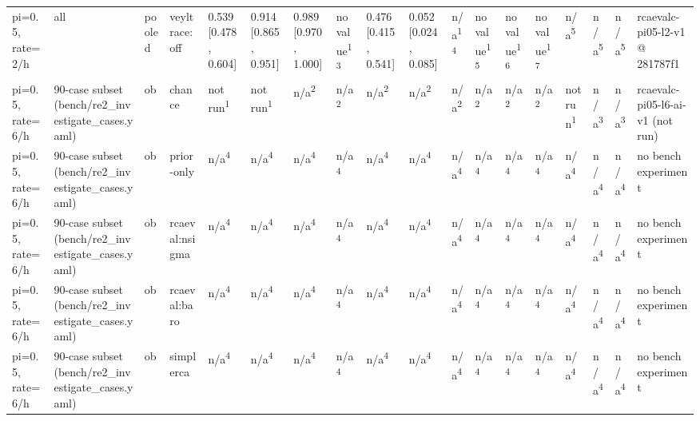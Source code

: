 \begin{table}[t]
\begin{tabular}{llllllllllllllllll}
pi=0.5, rate=2/h & all & pooled & veyltrace:off & 0.539 [0.478, 0.604] & 0.914 [0.865, 0.951] & 0.989 [0.970, 1.000] & no value\textsuperscript{13} & 0.476 [0.415, 0.541] & 0.052 [0.024, 0.085] & n/a\textsuperscript{14} & no value\textsuperscript{15} & no value\textsuperscript{16} & no value\textsuperscript{17} & n/a\textsuperscript{5} & n/a\textsuperscript{5} & n/a\textsuperscript{5} & rcaevalc-pi05-l2-v1 @ 281787f1 \\
pi=0.5, rate=6/h & 90-case subset (bench/re2\_investigate\_cases.yaml) & ob & chance & not run\textsuperscript{1} & not run\textsuperscript{1} & n/a\textsuperscript{2} & n/a\textsuperscript{2} & n/a\textsuperscript{2} & n/a\textsuperscript{2} & n/a\textsuperscript{2} & n/a\textsuperscript{2} & n/a\textsuperscript{2} & n/a\textsuperscript{2} & not run\textsuperscript{1} & n/a\textsuperscript{3} & n/a\textsuperscript{3} & rcaevalc-pi05-l6-ai-v1 (not run) \\
pi=0.5, rate=6/h & 90-case subset (bench/re2\_investigate\_cases.yaml) & ob & prior-only & n/a\textsuperscript{4} & n/a\textsuperscript{4} & n/a\textsuperscript{4} & n/a\textsuperscript{4} & n/a\textsuperscript{4} & n/a\textsuperscript{4} & n/a\textsuperscript{4} & n/a\textsuperscript{4} & n/a\textsuperscript{4} & n/a\textsuperscript{4} & n/a\textsuperscript{4} & n/a\textsuperscript{4} & n/a\textsuperscript{4} & no bench experiment \\
pi=0.5, rate=6/h & 90-case subset (bench/re2\_investigate\_cases.yaml) & ob & rcaeval:nsigma & n/a\textsuperscript{4} & n/a\textsuperscript{4} & n/a\textsuperscript{4} & n/a\textsuperscript{4} & n/a\textsuperscript{4} & n/a\textsuperscript{4} & n/a\textsuperscript{4} & n/a\textsuperscript{4} & n/a\textsuperscript{4} & n/a\textsuperscript{4} & n/a\textsuperscript{4} & n/a\textsuperscript{4} & n/a\textsuperscript{4} & no bench experiment \\
pi=0.5, rate=6/h & 90-case subset (bench/re2\_investigate\_cases.yaml) & ob & rcaeval:baro & n/a\textsuperscript{4} & n/a\textsuperscript{4} & n/a\textsuperscript{4} & n/a\textsuperscript{4} & n/a\textsuperscript{4} & n/a\textsuperscript{4} & n/a\textsuperscript{4} & n/a\textsuperscript{4} & n/a\textsuperscript{4} & n/a\textsuperscript{4} & n/a\textsuperscript{4} & n/a\textsuperscript{4} & n/a\textsuperscript{4} & no bench experiment \\
pi=0.5, rate=6/h & 90-case subset (bench/re2\_investigate\_cases.yaml) & ob & simplerca & n/a\textsuperscript{4} & n/a\textsuperscript{4} & n/a\textsuperscript{4} & n/a\textsuperscript{4} & n/a\textsuperscript{4} & n/a\textsuperscript{4} & n/a\textsuperscript{4} & n/a\textsuperscript{4} & n/a\textsuperscript{4} & n/a\textsuperscript{4} & n/a\textsuperscript{4} & n/a\textsuperscript{4} & n/a\textsuperscript{4} & no bench experiment \\

\end{tabular}
\end{table}
